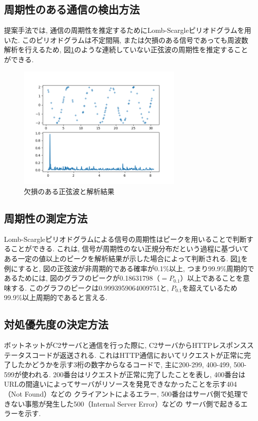 \documentclass[twocolumn,9]{ltjsarticle}
\begin{document}
\subsection{周期性のある通信の検出方法}
提案手法では, 通信の周期性を推定するためにLomb-Scargleピリオドグラム\cite{vanderplas2018understanding}を用いた. 
このピリオドグラムは不定間隔, または欠損のある信号であっても周波数解析を行えるため, 
図\ref{fig:lombscargle}のような連続していない正弦波の周期性を推定することができる. 

\begin{figure}[htb]
    \centering
    \includegraphics[width=8cm]{images/【実験】LombScargleピリオドグラムによるShinoBot通信の解析/lombscargle.png}
    \caption{欠損のある正弦波と解析結果}
    \label{fig:lombscargle}
\end{figure}

\subsection{周期性の測定方法}
Lomb-Scargleピリオドグラムによる信号の周期性はピークを用いることで判断することができる. 
これは, 信号が周期性のない正規分布だという過程に基づいてある一定の値以上のピークを解析結果が示した場合によって判断される. 
図\ref{fig:lombscargle}を例にすると, 図の正弦波が非周期的である確率が0.1\%以上, 
つまり99.9\%周期的であるためには, 図のグラフのピークが0.18631798（${=P_{0.1}}$）以上であることを意味する. 
このグラフのピークは0.9993959064009751と, ${P_{0.1}}$を超えているため99.9\%以上周期的であると言える. 

\subsection{対処優先度の決定方法}
ボットネットがC2サーバと通信を行った際に, C2サーバからHTTPレスポンスステータスコードが返送される. 
これはHTTP通信においてリクエストが正常に完了したかどうかを示す3桁の数字からなるコードで, 
主に200-299, 400-499, 500-599が使われる. 200番台はリクエストが正常に完了したことを表し, 
400番台はURLの間違いによってサーバがリソースを発見できなかったことを示す404（Not Found）などの
クライアントによるエラー, 500番台はサーバ側で処理できない事態が発生した500（Internal Server Error）などの
サーバ側で起きるエラーを示す. 
\end{document}
